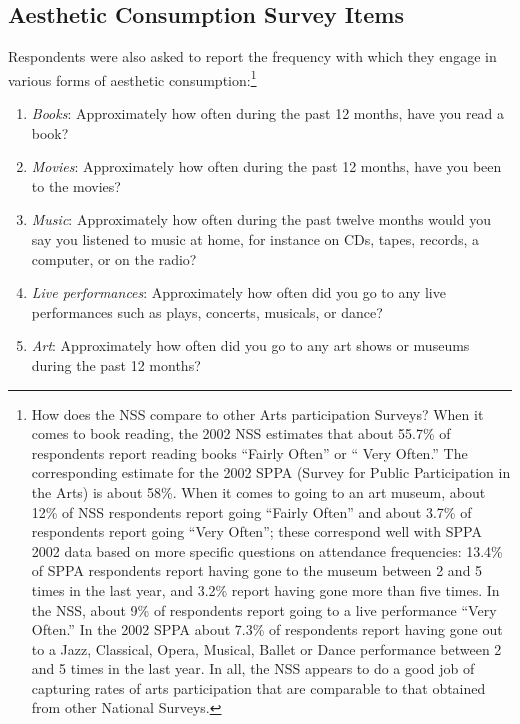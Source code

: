 \subsection{Aesthetic Consumption Survey Items}
Respondents were also asked to report the frequency with which they engage in various forms of aesthetic consumption:\footnote{How does the NSS compare to other Arts participation Surveys?  When it comes to book reading, the 2002 NSS estimates that about 55.7\% of respondents report reading books ``Fairly Often'' or `` Very Often.''  The corresponding estimate for the 2002 SPPA (Survey for Public Participation in the Arts) is about 58\%.  When it comes to going to an art museum, about 12\% of NSS respondents report going ``Fairly Often'' and about 3.7\% of respondents report going ``Very Often''; these correspond well with SPPA 2002 data based on more specific questions on attendance frequencies:  13.4\% of SPPA respondents report having gone to the museum between 2 and 5 times in the last year, and 3.2\% report having gone more than five times.  In the NSS, about 9\% of respondents report going to a live performance ``Very Often.''  In the 2002 SPPA about 7.3\% of respondents report having gone out to a Jazz, Classical, Opera, Musical, Ballet or Dance performance between 2 and 5 times in the last year.  In all, the NSS appears to do a good job of capturing rates of arts participation that are comparable to that obtained from other National Surveys.}
 
\begin{enumerate}
\item  \emph{Books}:  Approximately how often during the past 12 months, have you read a book?
\item  \emph{Movies}:  Approximately how often during the past 12 months, have you been to the movies? 
\item\emph{Music}: Approximately how often during the past twelve months would you say you listened to music at home, for instance on CDs, tapes, records, a computer, or on the radio?
\item  \emph{Live performances}: Approximately how often did you go to any live performances such as plays, concerts, musicals, or dance?
\item  \emph{Art}:  Approximately how often did you go to any art shows or museums during the past 12 months? 
\end{enumerate}  